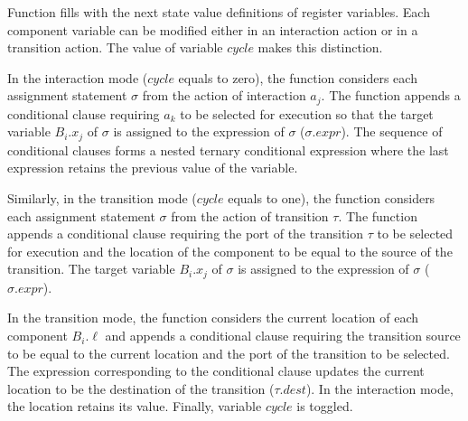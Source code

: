 Function  fills  with the next state value definitions of register variables.
Each component variable can be modified either in an interaction action or in a transition action.
The value of variable $\mathit{cycle}$ makes this distinction. 

In the interaction mode ($\mathit{cycle}$ equals to zero), the function considers each assignment statement $\sigma$ from the action of interaction $a_j$.
The function appends a conditional clause requiring $a_k$ to be selected for execution so that the target variable $B_i.x_j$ of $\sigma$ is assigned to the expression of $\sigma$ ($\sigma.\mathit{expr}$). 
The sequence of conditional clauses forms a nested ternary conditional expression where the last expression retains the previous value of the variable. 

Similarly, in the transition mode ($\mathit{cycle}$ equals to one), the function considers each assignment statement $\sigma$ from the action of transition $\tau$. The function appends a conditional clause requiring the port of the transition $\tau$ to be selected for execution and the location of the component to be equal to the source of the transition. The target variable $B_i.x_j$ of $\sigma$ is assigned to the expression of $\sigma$ ($\sigma.expr$). 

In the transition mode, the function considers the current location of each component $B_i.\ell$ and appends a conditional clause requiring the transition source to be equal to the current location and the port of the transition to be selected. The expression corresponding to the conditional clause updates the current location to be the destination of the transition ($\tau.dest$).  In the interaction mode, the location retains its value.
Finally, variable $\mathit{cycle}$ is toggled. 

